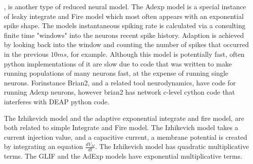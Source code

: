  \cite{brette2005adaptive}, is another type of reduced neural model. The Adexp model is a special instance of leaky integrate and Fire model which most often appears with an exponential spike shape. The models instantaneous spiking rate is calculated via a consulting finite time "windows" into the neurons recent spike history. Adaption is achieved by looking back into the window and counting the number of spikes that occurred in the previous $10ms$, for example. Although this model is potentially fast, often python implementations of it are slow due to code that was written to make running populations of many neurons fast, at the expense of running single neurons. Forinstance Brian2, and a related tool neurodynamics, have code for running Adexp neurons, however brian2 has network c-level cython code that interferes with DEAP python code. 

The Izhikevich model and the adaptive exponential integrate and fire model, are both related to simple Integrate and Fire model. The Izhikevich model takes a current injection value, and a capacitive current, a membrane potential is created by integrating an equation $\frac{d V_{M}}{dt}$. The Izhikevich model has quadratic multiplicative terms. The GLIF and the AdExp models have exponential multiplicative terms.



